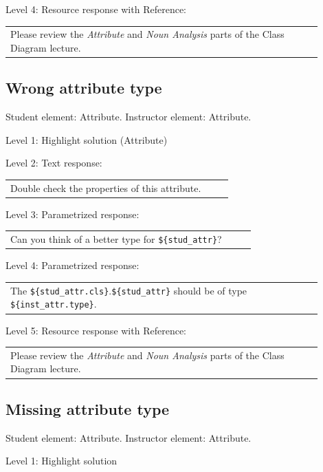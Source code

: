 \noindent Level 4: Resource response with Reference: \medskip

\begin{tabular}{|p{0.9\linewidth}}
Please review the \textit{Attribute} and \textit{Noun Analysis} parts of the Class Diagram lecture.
\end{tabular} \medskip


\subsection{Wrong attribute type}

Student element: Attribute. Instructor element: Attribute. \medskip

\noindent Level 1: Highlight solution (Attribute) \medskip

\noindent Level 2: Text response: \medskip

\begin{tabular}{|p{0.9\linewidth}}
Double check the properties of this attribute.
\end{tabular} \medskip

\noindent Level 3: Parametrized response: \medskip

\begin{tabular}{|p{0.9\linewidth}}
Can you think of a better type for \verb|${stud_attr}|?
\end{tabular} \medskip

\noindent Level 4: Parametrized response: \medskip

\begin{tabular}{|p{0.9\linewidth}}
The \verb|${stud_attr.cls}|.\verb|${stud_attr}| should be of type \verb|${inst_attr.type}|.
\end{tabular} \medskip

\noindent Level 5: Resource response with Reference: \medskip

\begin{tabular}{|p{0.9\linewidth}}
Please review the \textit{Attribute} and \textit{Noun Analysis} parts of the Class Diagram lecture.
\end{tabular} \medskip


\subsection{Missing attribute type}

Student element: Attribute. Instructor element: Attribute. \medskip

\noindent Level 1: Highlight solution  \medskip

